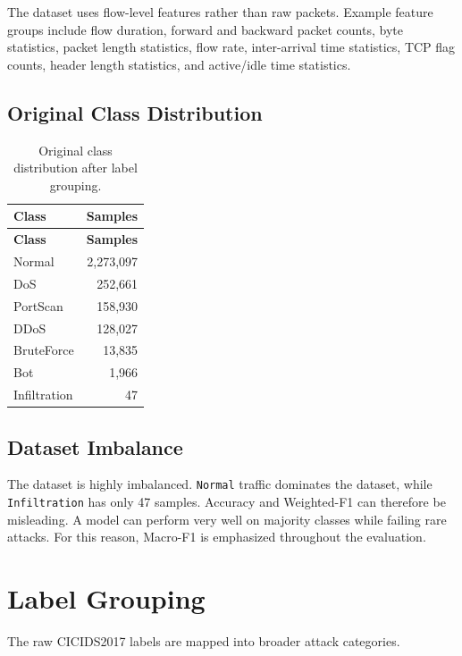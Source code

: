 \documentclass[12pt,a4paper]{article}
\begin{document}
The dataset uses flow-level features rather than raw packets. Example feature groups include flow duration, forward and backward packet counts, byte statistics, packet length statistics, flow rate, inter-arrival time statistics, TCP flag counts, header length statistics, and active/idle time statistics.

\subsection{Original Class Distribution}

\begin{longtable}{l r}
\caption{Original class distribution after label grouping.}\\
\toprule
\textbf{Class} & \textbf{Samples} \\
\midrule
\endfirsthead
\toprule
\textbf{Class} & \textbf{Samples} \\
\midrule
\endhead
Normal & 2,273,097 \\
DoS & 252,661 \\
PortScan & 158,930 \\
DDoS & 128,027 \\
BruteForce & 13,835 \\
Bot & 1,966 \\
Infiltration & 47 \\
\bottomrule
\end{longtable}

\subsection{Dataset Imbalance}

The dataset is highly imbalanced. \texttt{Normal} traffic dominates the dataset, while \texttt{Infiltration} has only 47 samples. Accuracy and Weighted-F1 can therefore be misleading. A model can perform very well on majority classes while failing rare attacks. For this reason, Macro-F1 is emphasized throughout the evaluation.

\section{Label Grouping}

The raw CICIDS2017 labels are mapped into broader attack categories.
\end{document}
